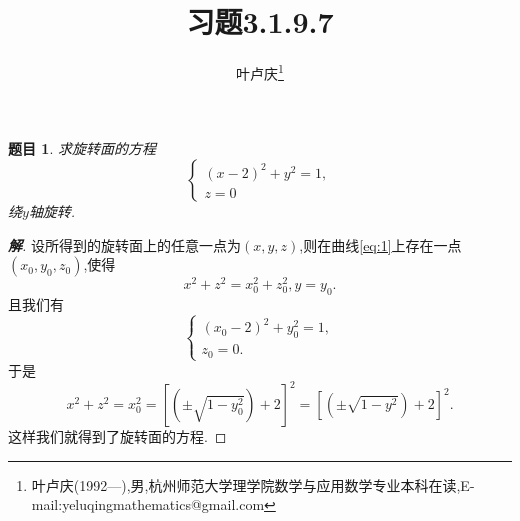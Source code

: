 \documentclass[a4paper]{article}
\newtheorem*{exe}{题目}
\newenvironment{exercise}
{\bigskip\begin{mdframed}\begin{exe}}
    {\end{exe}\end{mdframed}\bigskip}
\begin{document}
\title{\huge{\bf{习题3.1.9.7}}} \author{\small{叶卢庆\footnote{叶卢庆(1992---),男,杭州师范大学理学院数学与应用数学专业本科在读,E-mail:yeluqingmathematics@gmail.com}}}
\maketitle
\begin{exercise}
求旋转面的方程
\begin{equation}\label{eq:1}
\begin{cases}
  (x-2)^2+y^2=1,\\
z=0
\end{cases}
\end{equation}
绕$y$轴旋转.
\end{exercise}
\begin{proof}[\textbf{解}]
设所得到的旋转面上的任意一点为$(x,y,z)$,则在曲线\eqref{eq:1}上存在一点
$(x_0,y_0,z_0)$,使得
$$
x^2+z^2=x_0^2+z_0^2,y=y_0.
$$
且我们有
$$
\begin{cases}
  (x_0-2)^2+y_0^2=1,\\
z_0=0.
\end{cases}
$$
于是
$$
x^2+z^2=x_0^2=[(\pm\sqrt{1-y_0^2})+2]^2=[(\pm\sqrt{1-y^2})+2]^2.
$$
这样我们就得到了旋转面的方程.
\end{proof}
\end{document}
